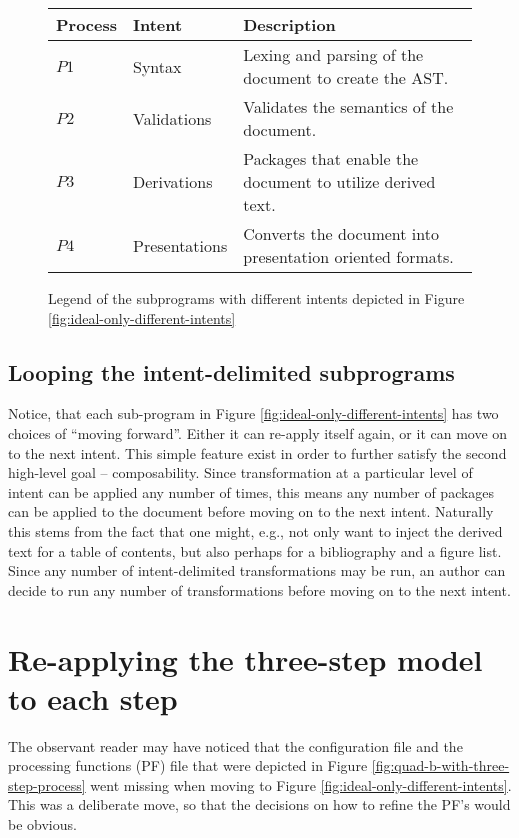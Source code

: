 \documentclass{scrreprt}
\begin{document}
\begin{figure}[h]
\begin{tabular}{l l l}
Process & Intent & Description
\\ \hline

$P1$ & Syntax & Lexing and parsing of the document to create the AST.
\\

$P2$ & Validations & Validates the semantics of the document.
\\

$P3$ & Derivations & Packages that enable the document to utilize derived text.
\\

$P4$ & Presentations & Converts the document into presentation oriented formats.
\\
\end{tabular}
\caption{Legend of the subprograms with different intents depicted in Figure \ref{fig:ideal-only-different-intents}}
\label{tbl:ideal-only-different-intents-legend}
\end{figure}


\subsection{Looping the intent-delimited subprograms}
\label{sec:ideal-looping-subprograms}
Notice, that each sub-program in Figure \ref{fig:ideal-only-different-intents} has two choices of ``moving forward''. Either it can re-apply itself again, or it can move on to the next intent. This simple feature exist in order to further satisfy the second high-level goal -- composability. Since transformation at a particular level of intent can be applied any number of times, this means any number of packages can be applied to the document before moving on to the next intent. Naturally this stems from the fact that one might, e.g., not only want to inject the derived text for a table of contents, but also perhaps for a bibliography and a figure list. Since any number of intent-delimited transformations may be run, an author can decide to run any number of transformations before moving on to the next intent.



\section{Re-applying the three-step model to each step}
The observant reader may have noticed that the configuration file and the processing functions (PF) file that were depicted in Figure \ref{fig:quad-b-with-three-step-process} went missing when moving to Figure \ref{fig:ideal-only-different-intents}. This was a deliberate move, so that the decisions on how to refine the PF's would be obvious.
\end{document}
